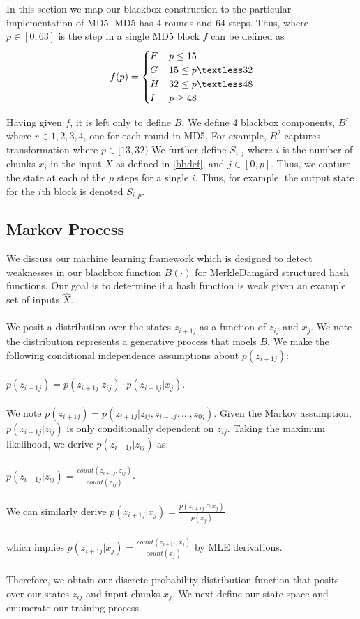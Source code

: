 \documentclass[letterpaper,twocolumn,10pt]{article}
\begin{document}
In this section we map our blackbox construction to the particular implementation of MD5. MD5 has 4 rounds and 64 steps. Thus, where $p \in [0,63]$ is the step in a single MD5 block $f$ can be defined as 
$$  f(p) = 
\begin{cases} 
      F &   p \leq 15 \\
      G &  15 \leq p \textless 32 \\
      H &  32 \leq p \textless 48 \\
      I   &  p \geq 48 \\
      
\end{cases}
 $$
 
Having given $f$, it is left only to define $B$. We define 4 blackbox components, $B^r$ where $r \in {1,2,3,4}$, one for each round in MD5. For example, $B^2$ captures transformation where $p \in [13,32)$  We further define $S_{i,j}$ where $i$ is the number of chunks $x_i$ in the input $X$ as defined in \ref{bbdef}, and $j \in [0,p]$. Thus, we capture the state at each of the $p$ steps for a single $i$. Thus, for example, the output state for the $i$th block is denoted $S_{i,p}$. 

\subsection{Markov Process}
We discuss our machine learning framework which is designed to detect weaknesses in our blackbox function $B(\cdot)$ for Merkle{\textendash}Damg\r{a}rd structured hash functions. Our goal is to determine if a hash function is weak given an example set of inputs $\hat{X}$. 
\\
\\
We posit a distribution over the states $z_{i+1j}$ as a function of $z_{ij}$ and $x_{j}$. We note the distribution represents a generative process that moels $B$. We make the following conditional independence assumptions about $p(z_{i+1j})$:
\\
\\
$p(z_{i+1j}) = p(z_{i+1j} | z_{ij}) \cdot p(z_{i+1j} | x_{j})$. 
\\
\\
We note $p(z_{i+1j}) = p(z_{i+1j} | z_{ij}, z_{i-1j},..., z_{0j})$. Given the Markov assumption, $p(z_{i+1j} | z_{ij})$ is only conditionally dependent on $z_{ij}$. Taking the maximum likelihood, we derive $p(z_{i+1j} | z_{ij})$ as:
\\
\\
$p(z_{i+1j} | z_{ij}) = \frac{count(z_{i+1j}, z_{ij})}{count(z_{ij})}$. 
\\
\\
We can similarly derive $p(z_{i+1j} | x_{j}) = \frac{p(z_{i+1j} \cap x_{j})}{p(x_{j})}$ 
\\
\\
which implies $p(z_{i+1j} | x_{j}) = \frac{count(z_{i+1j}, x_{j})}{count(x_{j})}$ by MLE derivations. 
\\
\\
Therefore, we obtain our discrete probability distribution function that posits over our states $z_{ij}$ and input chunks $x_{j}$. We next define our state space and enumerate our training process.
\end{document}
